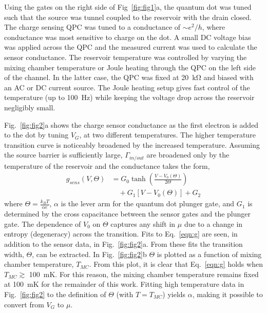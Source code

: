 \documentclass[preprint,showpacs,preprintnumbers,amsmath,amssymb,pra,aps,superscriptaddress]{revtex4-1}
\begin{document}
Using the gates on the right side of Fig~\ref{fig:fig1}a, the quantum dot was tuned such that the source was tunnel coupled to the reservoir with the drain closed. The charge sensing QPC was tuned to a conductance of ${\sim}e^2/h$, where conductance was most sensitive to charge on the dot. A small DC voltage bias was applied across the QPC and the measured current was used to calculate the sensor conductance. The reservoir temperature was controlled by varying the mixing chamber temperature or Joule heating through the QPC on the left side of the channel. In the latter case, the QPC was fixed at \SI{20}{\kilo\ohm} and biased with an AC or DC current source. The Joule heating setup gives fast control of the temperature (up to \SI{100}{\hertz}) while keeping the voltage drop across the reservoir negligibly small.

Fig.~\ref{fig:fig2}a shows the charge sensor conductance as the first electron is added to the dot by tuning $V_G$, at two different temperatures. The higher temperature transition curve is noticeably broadened by the increased temperature. Assuming the source barrier is sufficiently large, $\Gamma_{in/out}$ are broadened only by the temperature of the reservoir and the conductance takes the form,
%
\begin{align}
\label{eqn:g}
        g_{sens}(V,\Theta) &= G_0 \tanh\left(\frac{V-V_0(\Theta)}{2\Theta}\right)  \\
                        &\quad + G_1\left[V-V_0(\Theta)\right] + G_2 \nonumber
\end{align}
%
where $\Theta = \frac{k_B T}{\alpha e}$, $\alpha$ is the lever arm for the quantum dot plunger gate, and $G_1$ is determined by the cross capacitance between the sensor gates and the plunger gate. The dependence of $V_0$ on $\Theta$ captures any shift in $\mu$ due to a change in entropy (degeneracy) across the transition. Fits to Eq.~\ref{eqn:g} are seen, in addition to the sensor data, in Fig.~\ref{fig:fig2}a. From these fits the transition width, $\Theta$, can be extracted. In Fig.~\ref{fig:fig2}b $\Theta$ is plotted as a function of mixing chamber temperature, $T_{MC}$. From this plot, it is clear that Eq.~\ref{eqn:g} holds when $T_{MC}\gtrsim$ \SI{100}{\milli\kelvin}. For this reason, the mixing chamber temperature remains fixed at \SI{100}{\milli\kelvin} for the remainder of this work. Fitting high temperature data in Fig.~\ref{fig:fig2} to the definition of $\Theta$ (with $T=T_{MC}$) yields $\alpha$, making it possible to convert from $V_G$ to $\mu$.
\end{document}
